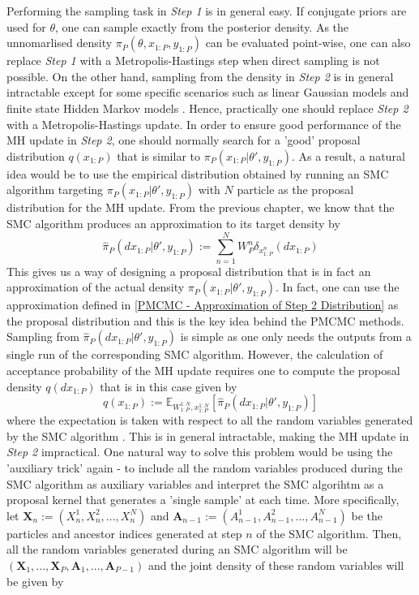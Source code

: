 \documentclass[12pt,a4paper]{article}
\begin{document}
Performing the sampling task in \textit{Step 1} is in general easy. If conjugate priors are used for $\theta$, one can sample exactly from the posterior density. As the unnomarlised density $\pi_P(\theta,x_{1:P},y_{1:P})$ can be evaluated point-wise, one can also replace \textit{Step 1} with a Metropolis-Hastings step when direct sampling is not possible. On the other hand, sampling from the density in \textit{Step 2} is in general intractable except for some specific scenarios such as linear Gaussian models and finite state Hidden Markov models \citep{andrieu2010particle}. Hence, practically one should replace \textit{Step 2} with a Metropolis-Hastings update. In order to ensure good performance of the MH update in \textit{Step 2}, one should normally search for a 'good' proposal distribution $q(x_{1:P})$ that is similar to $\pi_P(x_{1:P}|\theta',y_{1:P})$. As a result, a natural idea would be to use the empirical distribution obtained by running an SMC algorithm targeting $\pi_P(x_{1:P}|\theta',y_{1:P})$ with $N$ particle as the proposal distribution for the MH update. From the previous chapter, we know that the SMC algorithm produces an approximation to its target density by
\begin{equation}
    \label{PMCMC - Approximation of Step 2 Distribution}
    \hat{\pi}_P(dx_{1:P}|\theta',y_{1:P}):=\sum_{n=1}^{N} W_P^n \delta_{x_{1:P}^n}(dx_{1:P})
\end{equation}
This gives us a way of designing a proposal distribution that is in fact an approximation of the actual density $\pi_P(x_{1:P}|\theta',y_{1:P})$. In fact, one can use the approximation defined in \eqref{PMCMC - Approximation of Step 2 Distribution} as the proposal distribution and this is the key idea behind the PMCMC methods. Sampling from $\hat{\pi}_P(dx_{1:P}|\theta',y_{1:P})$ is simple as one only needs the outputs from a single run of the corresponding SMC algorithm. However, the calculation of acceptance probability of the MH update requires one to compute the proposal density $q(dx_{1:P})$ that is in this case given by 
\begin{equation}
    q(x_{1:P}) := \mathbb{E}_{W_{1:P}^{1:N},x_{1:P}^{1:N}}\left[\hat{\pi}_P(dx_{1:P}|\theta',y_{1:P})\right]
\end{equation}
where the expectation is taken with respect to all the random variables generated by the SMC algorithm \citep{andrieu2010particle}. This is in general intractable, making the MH update in \textit{Step 2} impractical. One natural way to solve this problem would be using the 'auxiliary trick' again - to include all the random variables produced during the SMC algorithm as auxiliary variables and interpret the SMC algorihtm as a proposal kernel that generates a 'single sample' at each time. More specifically, let $\mathbf{X}_n := \left(X_n^1,X_n^2,...,X_n^N\right)$ and $\mathbf{A}_{n-1}:=\left(A_{n-1}^1,A_{n-1}^2,...,A_{n-1}^N\right)$ be the particles and ancestor indices generated at step $n$ of the SMC algorithm. Then, all the random variables generated during an SMC algorithm will be $\left(\mathbf{X}_1,...,\mathbf{X}_P,\mathbf{A}_1,...,\mathbf{A}_{P-1}\right)$ and the joint density of these random variables will be given by 
\end{document}
